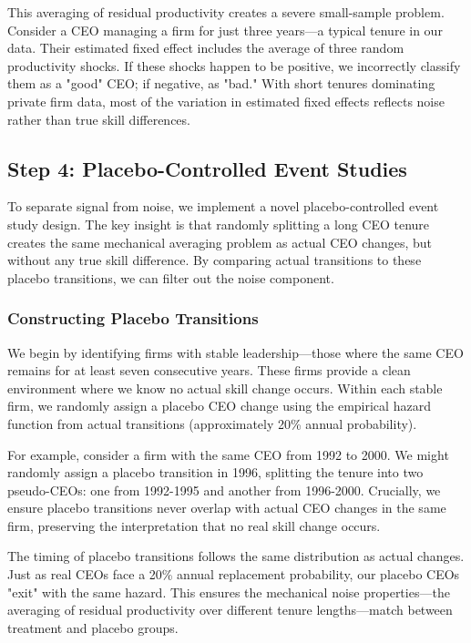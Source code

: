 \documentclass[11pt,a4paper]{article}
\begin{document}
This averaging of residual productivity creates a severe small-sample problem. Consider a CEO managing a firm for just three years—a typical tenure in our data. Their estimated fixed effect includes the average of three random productivity shocks. If these shocks happen to be positive, we incorrectly classify them as a "good" CEO; if negative, as "bad." With short tenures dominating private firm data, most of the variation in estimated fixed effects reflects noise rather than true skill differences.

\subsection{Step 4: Placebo-Controlled Event Studies}

To separate signal from noise, we implement a novel placebo-controlled event study design. The key insight is that randomly splitting a long CEO tenure creates the same mechanical averaging problem as actual CEO changes, but without any true skill difference. By comparing actual transitions to these placebo transitions, we can filter out the noise component.

\subsubsection{Constructing Placebo Transitions}

We begin by identifying firms with stable leadership—those where the same CEO remains for at least seven consecutive years. These firms provide a clean environment where we know no actual skill change occurs. Within each stable firm, we randomly assign a placebo CEO change using the empirical hazard function from actual transitions (approximately 20\% annual probability).

For example, consider a firm with the same CEO from 1992 to 2000. We might randomly assign a placebo transition in 1996, splitting the tenure into two pseudo-CEOs: one from 1992-1995 and another from 1996-2000. Crucially, we ensure placebo transitions never overlap with actual CEO changes in the same firm, preserving the interpretation that no real skill change occurs.

The timing of placebo transitions follows the same distribution as actual changes. Just as real CEOs face a 20\% annual replacement probability, our placebo CEOs "exit" with the same hazard. This ensures the mechanical noise properties—the averaging of residual productivity over different tenure lengths—match between treatment and placebo groups.
\end{document}

